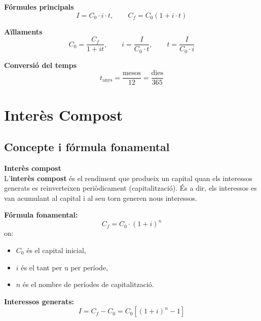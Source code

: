 \documentclass[12pt]{article}
\begin{document}
\begin{resum}[title=Resum 2: Interès Simple]
\textbf{Fórmules principals}
\[
I = C_0 \cdot i \cdot t, \qquad C_f = C_0(1 + i \cdot t)
\]

\textbf{Aïllaments}
\[
C_0 = \dfrac{C_f}{1+it}, \qquad
i = \dfrac{I}{C_0 \cdot t}, \qquad
t = \dfrac{I}{C_0 \cdot i}
\]

\textbf{Conversió del temps}
\[
t_{\text{anys}} = \dfrac{\text{mesos}}{12} = \dfrac{\text{dies}}{365}
\]
\end{resum}

\newpage

\section{Interès Compost}

\subsection{Concepte i fórmula fonamental}

\begin{concept}
\textbf{Interès compost}\\
L'\textbf{interès compost} és el rendiment que produeix un capital quan els interessos generats es reinverteixen periòdicament (capitalització). És a dir, els interessos es van acumulant al capital i al seu torn generen nous interessos.

\textbf{Fórmula fonamental:}
\[
\boxed{C_f = C_0 \cdot (1 + i)^n}
\]
on:
\begin{itemize}
    \item $C_0$ és el capital inicial,
    \item $i$ és el tant per u per període,
    \item $n$ és el nombre de períodes de capitalització.
\end{itemize}

\textbf{Interessos generats:}
\[
I = C_f - C_0 = C_0\left[(1+i)^n - 1\right]
\]
\end{concept}
\end{document}

